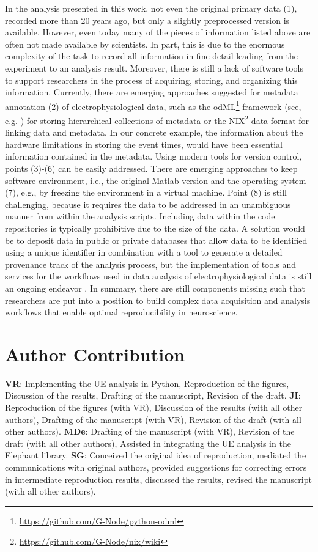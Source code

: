 \documentclass[10pt,a4paper,onecolumn]{article}
\begin{document}
In the analysis presented in this work, not even the original primary
data (1), recorded more than 20 years ago, but only a slightly
preprocessed version is available. However, even today many of the
pieces of information listed above are often not made available by
scientists. In part, this is due to the enormous complexity of the task
to record all information in fine detail leading from the experiment to
an analysis result. Moreover, there is still a lack of software tools to
support researchers in the process of acquiring, storing, and organizing
this information. Currently, there are emerging approaches suggested for
metadata annotation (2) of electrophysiological data, such as the
odML\footnote{\url{https://github.com/G-Node/python-odml}} framework
(see, e.g. \autocites{Grewe2011}{Zehl2016}) for storing hierarchical
collections of metadata or the NIX\footnote{\url{https://github.com/G-Node/nix/wiki}}
data format \autocite{Adrian2014} for linking data and metadata. In our
concrete example, the information about the hardware limitations in
storing the event times, would have been essential information contained
in the metadata. Using modern tools for version control, points (3)-(6)
can be easily addressed. There are emerging approaches to keep software
environment, i.e., the original Matlab version and the operating system
(7), e.g., by freezing the environment in a virtual machine. Point (8)
is still challenging, because it requires the data to be addressed in an
unambiguous manner from within the analysis scripts. Including data
within the code repositories is typically prohibitive due to the size of
the data. A solution would be to deposit data in public or private
databases that allow data to be identified using a unique identifier in
combination with a tool to generate a detailed provenance track of the
analysis process, but the implementation of tools and services for the
workflows used in data analysis of electrophysiological data is still an
ongoing endeavor \autocites{badia_incf_2015}{Denker2015_000}. In
summary, there are still components missing such that researchers are
put into a position to build complex data acquisition and analysis
workflows that enable optimal reproducibility in neuroscience.

\section{Author Contribution}\label{author-contribution}

\textbf{VR}: Implementing the UE analysis in Python, Reproduction of the
figures, Discussion of the results, Drafting of the manuscript, Revision
of the draft. \textbf{JI}: Reproduction of the figures (with VR),
Discussion of the results (with all other authors), Drafting of the
manuscript (with VR), Revision of the draft (with all other authors).
\textbf{MDe}: Drafting of the manuscript (with VR), Revision of the
draft (with all other authors), Assisted in integrating the UE analysis
in the Elephant library. \textbf{SG}: Conceived the original idea of
reproduction, mediated the communications with original authors,
provided suggestions for correcting errors in intermediate reproduction
results, discussed the results, revised the manuscript (with all other
authors).
\end{document}
